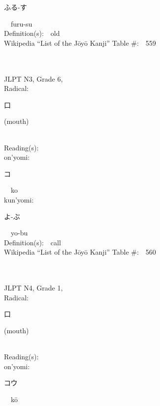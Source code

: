 \begin{multicols}{2}
{\hspace*{2em}}{\begin{CJK}{UTF8}{min} ふる-す \end{CJK}}\ \ furu-su\ \ \\
Definition(s):\ \ old \\
Wikipedia ``List of the J\=oy\=o Kanji'' Table \#:\ \ 559 \\
\ \ \\
{\fontsize{34pt}{40pt}  }\ \ \\  %
{JLPT N3, Grade 6, \\Radical:\ \ {\begin{CJK}{UTF8}{min} 口 \end{CJK}} (mouth) } \\
Reading(s):\ \ \\
{\hspace*{1em}}on'yomi:\ \ \\
{\hspace*{2em}}{\begin{CJK}{UTF8}{min} コ \end{CJK}}\ \ ko\ \ \\
{\hspace*{1em}}kun'yomi:\ \ \\
{\hspace*{2em}}{\begin{CJK}{UTF8}{min} よ-ぶ \end{CJK}}\ \ yo-bu\ \ \\
Definition(s):\ \ call \\
Wikipedia ``List of the J\=oy\=o Kanji'' Table \#:\ \ 560 \\
\ \ \\
{\fontsize{34pt}{40pt}  }\ \ \\  %
{JLPT N4, Grade 1, \\Radical:\ \ {\begin{CJK}{UTF8}{min} 口 \end{CJK}} (mouth) } \\
Reading(s):\ \ \\
{\hspace*{1em}}on'yomi:\ \ \\
{\hspace*{2em}}{\begin{CJK}{UTF8}{min} コウ \end{CJK}}\ \ k\=o\ \ \\

\end{multicols}
